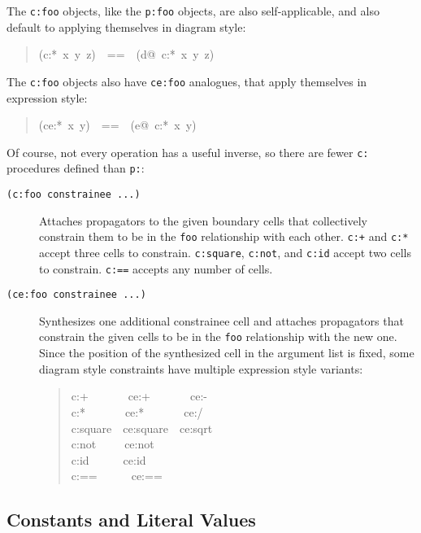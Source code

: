 \documentclass[12pt,letterpaper,english]{article}
\begin{document}
The \texttt{c:foo} objects, like the \texttt{p:foo} objects, are also
self-applicable, and also default to applying themselves
in diagram style:
\begin{quote}{\ttfamily \raggedright \noindent
(c:*~x~y~z)~~==~~(d@~c:*~x~y~z)
}\end{quote}

The \texttt{c:foo} objects also have \texttt{ce:foo} analogues, that
apply themselves in expression style:
\begin{quote}{\ttfamily \raggedright \noindent
(ce:*~x~y)~~==~~(e@~c:*~x~y)
}\end{quote}

Of course, not every operation has a useful inverse, so there are
fewer \texttt{c:} procedures defined than \texttt{p:}:
\begin{description}
\item[{\texttt{(c:foo constrainee ...)}}] \leavevmode 
Attaches propagators to the given boundary cells that collectively
constrain them to be in the \texttt{foo} relationship with each other.
\texttt{c:+} and \texttt{c:*} accept three cells to constrain.  \texttt{c:square},
\texttt{c:not}, and \texttt{c:id} accept two cells to constrain.  \texttt{c:==}
accepts any number of cells.

\item[{\texttt{(ce:foo constrainee ...)}}] \leavevmode 
Synthesizes one additional constrainee cell and attaches propagators
that constrain the given cells to be in the \texttt{foo} relationship
with the new one.  Since the position of the synthesized cell in
the argument list is fixed, some diagram style constraints have
multiple expression style variants:
\begin{quote}{\ttfamily \raggedright \noindent
c:+~~~~~~~ce:+~~~~~~~ce:-~\\
c:*~~~~~~~ce:*~~~~~~~ce:/~\\
c:square~~ce:square~~ce:sqrt~\\
c:not~~~~~ce:not~\\
c:id~~~~~~ce:id~\\
c:==~~~~~~ce:==
}\end{quote}
\end{description}



\subsection{Constants and Literal Values}
\label{constants-and-literal-values}
\end{document}
